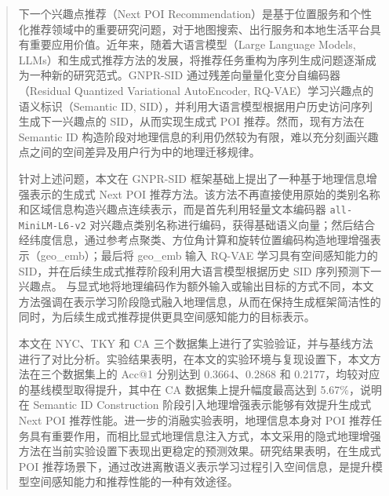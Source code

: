 

\begin{abstract}
下一个兴趣点推荐（Next POI Recommendation）是基于位置服务和个性化推荐领域中的重要研究问题，对于地图搜索、出行服务和本地生活平台具有重要应用价值。近年来，随着大语言模型（Large Language Models, LLMs）和生成式推荐方法的发展，将推荐任务重构为序列生成问题逐渐成为一种新的研究范式。GNPR-SID 通过残差向量量化变分自编码器（Residual Quantized Variational AutoEncoder, RQ-VAE）学习兴趣点的语义标识（Semantic ID, SID），并利用大语言模型根据用户历史访问序列生成下一兴趣点的 SID，从而实现生成式 POI 推荐。然而，现有方法在 Semantic ID 构造阶段对地理信息的利用仍然较为有限，难以充分刻画兴趣点之间的空间差异及用户行为中的地理迁移规律。

针对上述问题，本文在 GNPR-SID 框架基础上提出了一种基于地理信息增强表示的生成式 Next POI 推荐方法。该方法不再直接使用原始的类别名称和区域信息构造兴趣点连续表示，而是首先利用轻量文本编码器 \texttt{all-MiniLM-L6-v2} 对兴趣点类别名称进行编码，获得基础语义向量；然后结合经纬度信息，通过参考点聚类、方位角计算和旋转位置编码构造地理增强表示（geo\_emb）；最后将 geo\_emb 输入 RQ-VAE 学习具有空间感知能力的 SID，并在后续生成式推荐阶段利用大语言模型根据历史 SID 序列预测下一兴趣点。
与显式地将地理编码作为额外输入或输出目标的方式不同，本文方法强调在表示学习阶段隐式融入地理信息，从而在保持生成框架简洁性的同时，为后续生成式推荐提供更具空间感知能力的目标表示。

本文在 NYC、TKY 和 CA 三个数据集上进行了实验验证，并与基线方法进行了对比分析。实验结果表明，在本文的实验环境与复现设置下，本文方法在三个数据集上的 Acc@1 分别达到 0.3664、0.2868 和 0.2177，均较对应的基线模型取得提升，其中在 CA 数据集上提升幅度最高达到 5.67\%，说明在 Semantic ID Construction 阶段引入地理增强表示能够有效提升生成式 Next POI 推荐性能。进一步的消融实验表明，地理信息本身对 POI 推荐任务具有重要作用，而相比显式地理信息注入方式，本文采用的隐式地理增强方法在当前实验设置下表现出更稳定的预测效果。研究结果表明，在生成式 POI 推荐场景下，通过改进离散语义表示学习过程引入空间信息，是提升模型空间感知能力和推荐性能的一种有效途径。

\end{abstract}

